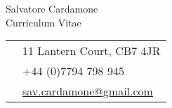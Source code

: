 \documentclass[11pt]{article} %
\begin{document}
\color{text1} %


\begin{minipage}[t]{0.49\textwidth}
\vspace{0pt}
{\huge{Salvatore Cardamone}}\\ %
{\color{headings} \Large{Curriculum Vitae}}
\end{minipage}\hfill
\begin{minipage}[t]{0.49\textwidth}
\vspace{1pt}
\colorbox{shade}{\textcolor{text1}{
\begin{tabular}{c|p{7cm}}
\raisebox{-3pt}{\textifsymbol{18}} & 11 Lantern Court, CB7 4JR \\ %
\raisebox{-2pt}{\Mobilefone} & +44 (0)7794 798 945 \\ %
\raisebox{-1pt}{\Letter} & \href{mailto:sc2018@cam.ac.uk}{sav.cardamone@gmail.com} \\ %
\end{tabular}
}}\\[10pt]
\end{minipage}\\
\end{document}
